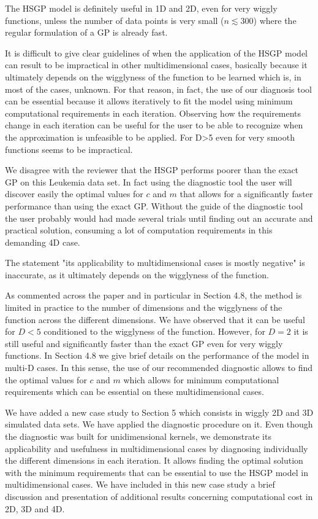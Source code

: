 \documentclass[11pt]{report}
\begin{document}
The HSGP model is definitely useful in 1D and 2D, even for very wiggly functions, unless the number of data points is very small ($n \lesssim 300$) where the regular formulation of a GP is already fast.

It is difficult to give clear guidelines of when the application of the HSGP model can result to be impractical in other multidimensional cases, basically because it ultimately depends on the wigglyness of the function to be learned which is, in most of the cases, unknown. For that reason, in fact, the use of our diagnosis tool can be essential because it allows iteratively to fit the model using minimum computational requirements in each iteration. Observing how the requirements change in each iteration can be useful for the user to be able to recognize when the approximation is unfeasible to be applied. For D>5 even for very smooth functions seems to be impractical.

We disagree with the reviewer that the HSGP performs poorer than the exact GP on this Leukemia data set. In fact using the diagnostic tool the user will discover easily the optimal values for $c$ and $m$ that allows for a significantly faster performance than using the exact GP. Without the guide of the diagnostic tool the user probably would had made several trials until finding out an accurate and practical solution, consuming a lot of computation requirements in this demanding 4D case.

The statement "its applicability to multidimensional cases is mostly negative" is inaccurate, as it ultimately depends on the wigglyness of the function.

As commented across the paper and in particular in Section 4.8, the method is limited in practice to the number of dimensions and the wigglyness of the function across the different dimensions. We have observed that it can be useful for $D<5$ conditioned to the wigglyness of the function. However, for $D=2$ it is still useful and significantly faster than the exact GP even for very wiggly functions. In Section 4.8 we give brief details on the performance of the model in multi-D cases. In this sense, the use of our recommended diagnostic allows to find the optimal values for $c$ and $m$ which allows for minimum computational requirements which can be essential on these multidimensional cases.

We have added a new case study to Section 5 which consists in wiggly 2D and 3D simulated data sets. We have applied the diagnostic procedure on it. Even though the diagnostic was built for unidimensional kernels, we demonstrate its applicability and usefulness in multidimensional cases by diagnosing individually the different dimensions in each iteration. It allows finding the  optimal solution with the minimum requirements that can be essential to use the HSGP model in multidimensional cases. We have included in this new case study a brief discussion and presentation of additional results concerning computational cost in 2D, 3D and 4D.
\end{document}
